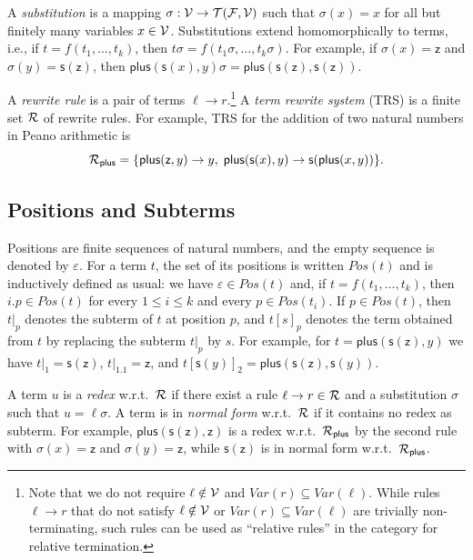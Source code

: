A \emph{substitution} is a mapping $\sigma : \mathcal{V} \to \mathcal{T}(\mathcal{F},\mathcal{V})$ such that $\sigma(x) = x$ for all but finitely many variables $x \in \mathcal{V}$.
Substitutions extend homomorphically to terms, i.e., if $t = f(t_1,\ldots,t_k)$, then $t\sigma = f(t_1\sigma,\ldots,t_k\sigma)$.
For example, if $\sigma(x) = \mathsf{z}$ and $\sigma(y) = \mathsf{s}(\mathsf{z})$, then
$\mathsf{plus}(\mathsf{s}(x),y)\sigma = \mathsf{plus}(\mathsf{s}(\mathsf{z}),\mathsf{s}(\mathsf{z}))$.

A \emph{rewrite rule} is a pair of terms $\ell \to r$.\footnote{Note that we do not require $\ell \notin \mathcal{V}$ and $\mathit{Var}(r) \subseteq \mathit{Var}(\ell)$.
While rules $\ell \to r$ that do not satisfy $\ell \notin \mathcal{V}$ or $\mathit{Var}(r) \subseteq \mathit{Var}(\ell)$ are trivially non-terminating, such rules can be used as ``relative rules'' in the category for relative termination.}
A \emph{term rewrite system} (TRS) is a finite set $\mathcal{R}$ of rewrite rules.
For example, TRS for the addition of two natural numbers in Peano arithmetic is
\[
  \mathcal{R}_{\mathsf{plus}} = \{\mathsf{plus}(\mathsf{z}, y) \to y,\; \mathsf{plus}(\mathsf{s}(x), y) \to \mathsf{s}(\mathsf{plus}(x,y))\}.
\]

\subsection{Positions and Subterms}

Positions are finite sequences of natural numbers, and the empty sequence is denoted by $\varepsilon$.
For a term $t$, the set of its positions is written $\mathit{Pos}(t)$ and is inductively defined as usual: 
we have $\varepsilon \in \mathit{Pos}(t)$ and, if $t = f(t_1,\ldots,t_k)$, then $i.p \in \mathit{Pos}(t)$ 
for every $1 \leq i \leq k$ and every $p \in \mathit{Pos}(t_i)$.
If $p \in \mathit{Pos}(t)$, then $t|_p$ denotes the subterm of $t$ at position $p$, and $t[s]_p$ denotes the term obtained 
from $t$ by replacing the subterm $t|_p$ by $s$.
For example, for $t = \mathsf{plus}(\mathsf{s}(\mathsf{z}),y)$ we have 
$t|_1 = \mathsf{s}(\mathsf{z})$, $t|_{1.1} = \mathsf{z}$, and $t[\mathsf{s}(y)]_2 = \mathsf{plus}(\mathsf{s}(\mathsf{z}),\mathsf{s}(y))$.

A term $u$ is a \emph{redex} w.r.t.\ $\mathcal{R}$ if there exist a rule $\ell \to r \in \mathcal{R}$ and a substitution $\sigma$ such that $u = \ell\sigma$.
A term is in \emph{normal form} w.r.t.\ $\mathcal{R}$ if it contains no redex as subterm.
For example, $\mathsf{plus}(\mathsf{s}(\mathsf{z}),\mathsf{z})$ is a redex w.r.t.\ $\mathcal{R}_{\mathsf{plus}}$ by the second rule with
$\sigma(x) = \mathsf{z}$ and $\sigma(y) = \mathsf{z}$, while $\mathsf{s}(\mathsf{z})$ is in normal form w.r.t.\ $\mathcal{R}_{\mathsf{plus}}$.

